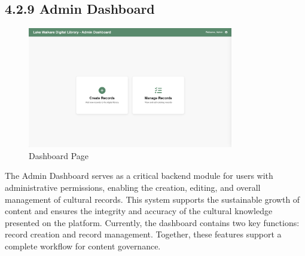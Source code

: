 \subsection*{4.2.9 Admin Dashboard}
\begin{figure}[H]
    \centering
    \includegraphics[width=0.8\textwidth]{screenshot/prototype_dashboard.png}
    \caption{Dashboard Page}
    \label{fig:architecture}
\end{figure}
The Admin Dashboard serves as a critical backend module for users with administrative permissions, enabling the creation, editing, and overall management of cultural records. This system supports the sustainable growth of content and ensures the integrity and accuracy of the cultural knowledge presented on the platform. Currently, the dashboard contains two key functions: record creation and record management. Together, these features support a complete workflow for content governance.

